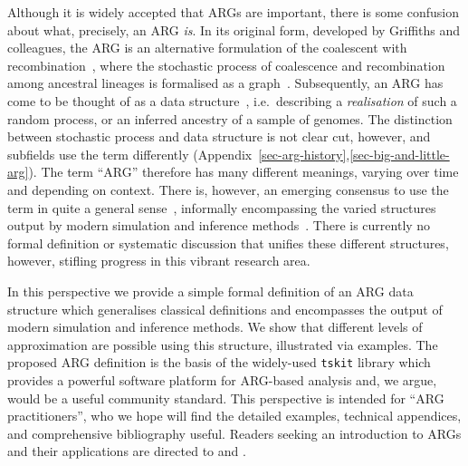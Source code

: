 \documentclass[9pt,twocolumn,twoside]{gsajnl}
\begin{document}
Although it is widely accepted that ARGs are important, there is some
confusion about what, precisely, an ARG \emph{is}.
In its original form,
developed by Griffiths and colleagues,
the ARG is an alternative
formulation of the coalescent with recombination~\citep{hudson1983properties},
where the stochastic process of coalescence and recombination
among ancestral lineages is formalised
as a graph~\citep{griffiths1991two,
ethier1990two,griffiths1996ancestral,griffiths1997ancestral}.
Subsequently, an ARG has come to be thought of as a data
structure~\citep{minichiello2006mapping}, i.e.\ describing
a \emph{realisation} of such a random process,
or an inferred ancestry of a sample of genomes.
The distinction between stochastic process
and data structure is not clear cut, however, and subfields use the term
differently (Appendix~\ref{sec-arg-history},\ref{sec-big-and-little-arg}).
The term ``ARG'' therefore has many different meanings, varying 
over time and depending on context. 
There is, however, an emerging consensus to use the term
in quite a general sense~\citep[e.g.][]{mathieson2020ancestry,hejase2020summary,
schaefer2021ancestral,harris2023using,zhang2023biobank,fan2023likelihood},
informally
encompassing the varied structures output by modern simulation and
inference methods~\citep{rasmussen2014genome, palamara2016argon, haller2018tree,
kelleher2019inferring, speidel2019method, baumdicker2021efficient,
zhang2023biobank}. 
There is currently no formal definition or systematic 
discussion that unifies these different structures,
however, stifling progress in this vibrant research area.

In this perspective we provide a simple formal definition
of an ARG data structure which generalises classical 
definitions and encompasses the output of modern simulation and inference 
methods. We show that different levels of approximation
are possible using this structure, illustrated via examples.
The proposed ARG definition is the basis of the widely-used \texttt{tskit}
library which provides a powerful software platform
for ARG-based analysis and, we argue, would be a useful community standard.
This perspective is intended for ``ARG practitioners'', who we hope
will find the detailed examples, technical appendices, and 
comprehensive bibliography useful.
Readers seeking an introduction to ARGs and their applications are 
directed to \citet{lewanski2024era}
and \citet{brandt2024promise}.
\end{document}
